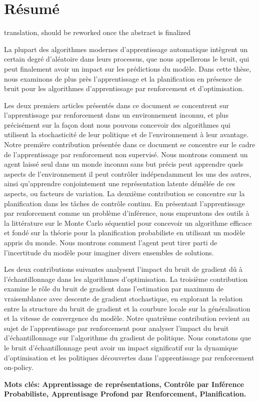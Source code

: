 \chapter*{R\'{e}sum\'{e}}
{\color{red} translation, should be reworked once the abstract is finalized}

La plupart des algorithmes modernes d'apprentissage automatique intègrent un certain degré d'aléatoire dans leurs processus, que nous appellerons le bruit, qui peut finalement avoir un impact sur les prédictions du modèle. Dans cette thèse, nous examinons de plus près l'apprentissage et la planification en présence de bruit pour les algorithmes d'apprentissage par renforcement et d'optimisation.

Les deux premiers articles présentés dans ce document se concentrent sur l'apprentissage par renforcement dans un environnement inconnu, et plus précisément sur la façon dont nous pouvons concevoir des algorithmes qui utilisent la stochasticité de leur politique et de l'environnement à leur avantage.
Notre première contribution présentée dans ce document se concentre sur le cadre de l'apprentissage par renforcement non supervisé. Nous montrons comment un agent laissé seul dans un monde inconnu sans but précis peut apprendre quels aspects de l'environnement il peut contrôler indépendamment les uns des autres, ainsi qu'apprendre conjointement une représentation latente démêlée de ces aspects, ou facteurs de variation.
La deuxième contribution se concentre sur la planification dans les tâches de contrôle continu. En présentant l'apprentissage par renforcement comme un problème d'inférence, nous empruntons des outils à la littérature sur le Monte Carlo séquentiel pour concevoir un algorithme efficace et fondé sur la théorie pour la planification probabiliste en utilisant un modèle appris du monde. Nous montrons comment l'agent peut tirer parti de l'incertitude du modèle pour imaginer divers ensembles de solutions.

Les deux contributions suivantes analysent l'impact du bruit de gradient dû à l'échantillonnage dans les algorithmes d'optimisation. 
La troisième contribution examine le rôle du bruit de gradient dans l'estimation par maximum de vraisemblance avec descente de gradient stochastique, en explorant la relation entre la structure du bruit de gradient et la courbure locale sur la généralisation et la vitesse de convergence du modèle. 
Notre quatrième contribution revient au sujet de l'apprentissage par renforcement pour analyser l'impact du bruit d'échantillonnage sur l'algorithme du gradient de politique. Nous constatons que le bruit d'échantillonnage peut avoir un impact significatif sur la dynamique d'optimisation et les politiques découvertes dans l'apprentissage par renforcement on-policy.


  {\bfseries Mots cl\'{e}s\hspace{-3pt}: Apprentissage de repr\'{e}sentations, Contr\^{o}le par Inf\'{e}rence Probabiliste, Apprentisage Profond par Renforcement, Planification.}
                                                                                                                                                            